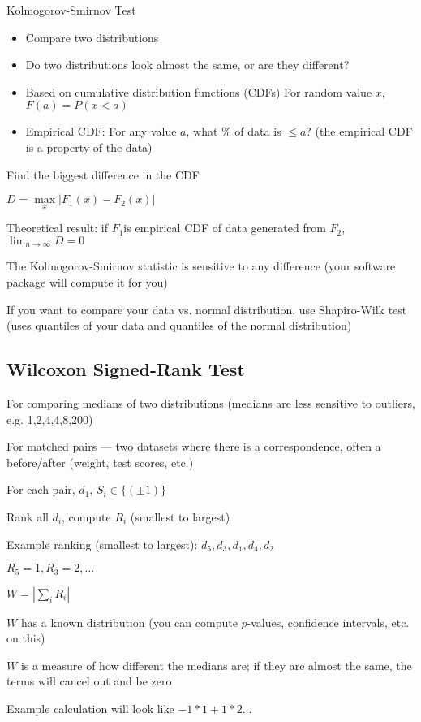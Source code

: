 \documentclass[twoside]{article}
\begin{document}
Kolmogorov-Smirnov Test
\begin{itemize}
\item Compare two distributions
\item Do two distributions look almost the same, or are they different?
\item Based on cumulative distribution functions (CDFs) For random value $x$, $F(a) = P(x<a)$
\item Empirical CDF: For any value $a$, what \% of data is $\leq a$? (the empirical CDF is a property of the data)
\end{itemize} 

Find the biggest difference in the CDF

$D = \max\limits_x | F_1(x) - F_2(x)|$

Theoretical result: if $F_1$is empirical CDF of data generated from $F_2$, $\lim_{n \rightarrow \infty} D = 0$

The Kolmogorov-Smirnov statistic is sensitive to any difference (your software package will compute it for you)

If you want to compare your data vs. normal distribution, use Shapiro-Wilk test (uses quantiles of your data and quantiles of the normal distribution)

\subsection{Wilcoxon Signed-Rank Test}

For comparing medians of two distributions (medians are less sensitive to outliers, e.g. 1,2,4,4,8,200)

For matched pairs --- two datasets where there is a correspondence, often a before/after (weight, test scores, etc.)

For each pair, $d_1$, $S_i \in \{ (\pm 1) \}$

Rank all $d_i$, compute $R_i$ (smallest to largest)

Example ranking (smallest to largest): $d_5, d_3, d_1, d_4, d_2$

$R_5 = 1, R_3 = 2, ...$

$W = | \sum\limits_i R_i |$

$W$ has a known distribution (you can compute $p$-values, confidence intervals, etc. on this)

$W$ is a measure of how different the medians are; if they are almost the same, the terms will cancel out and be zero

Example calculation will look like $-1*1 + 1*2...$
\end{document}
